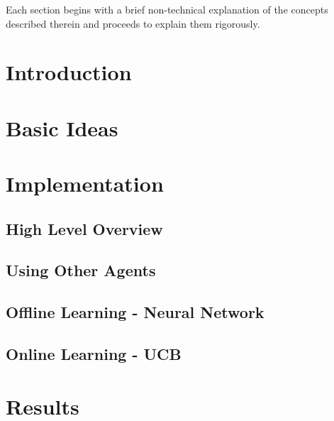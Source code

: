\documentclass[12pt]{article}
\numberwithin{equation}{section}
\begin{document}
			Each section begins with a brief non-technical explanation of the concepts described therein and proceeds to explain them rigorously.

	\newpage

	\tableofcontents

	\newpage

	\section{Introduction}		\label{sec:introduction}

		

	\section{Basic Ideas}		\label{sec:basic_ideas}

		

	\section{Implementation}		\label{sec:implementation}

		\subsection{High Level Overview}	\label{sec:implementation.high_level_view}

			

		\subsection{Using Other Agents}		\label{sec:implementation.using_other_agents}

			

		\subsection{Offline Learning - Neural Network}		\label{sec:implementation.neural_network}

			
		
		\subsection{Online Learning - UCB}		\label{sec:implementation.ucb}

			

	\section{Results}		\label{sec:results}	%
	
\end{document}
